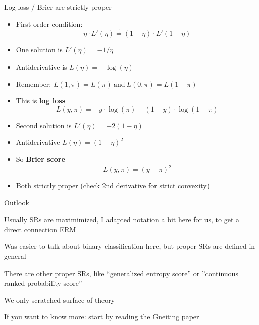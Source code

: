 \documentclass[11pt,compress,t,notes=noshow, xcolor=table]{beamer}
\begin{document}
\begin{vbframe}{Log loss / Brier are strictly proper}

\begin{itemize}
    \item First-order condition: 
    $$\eta \cdot L'(\eta) \overset{!}{=} (1-\eta) \cdot L'(1-\eta)$$
    \item One solution is $L'(\eta)=-1/\eta$ %
    \item Antiderivative is $L(\eta)=-\log(\eta)$ 
    \item Remember: 
    $L(1, \pi) = L(\pi) \ \text{and} \ L(0, \pi) = L(1-\pi)$
    \item This is \textbf{log loss} 
    $$L(y, \pi)=-y \cdot \log(\pi) - (1-y) \cdot \log(1-\pi)$$

    \item Second solution is $L'(\eta)=-2(1-\eta)$%
    \item Antiderivative $L(\eta)=(1-\eta)^2$%
    \item So \textbf{Brier score} 
    $$L(y, \pi)=(y - \pi)^2$$
  

\item Both strictly proper (check 2nd derivative for strict convexity)
\end{itemize}

\end{vbframe}

\begin{vbframe}{Outlook}

\begin{itemizeL}

    \item Usually SRs are maximimized, I adapted notation a bit here
    for us, to get a direct connection ERM

    \item Was easier to talk about binary classification here, 
    but proper SRs are defined in general

    \item There are other proper SRs, like ``generalized entropy score'' or ''continuous ranked probability score'' 

    \item We only scratched surface of theory

    \item  If you want to know more: start by reading the Gneiting paper
    
\end{itemizeL}


\end{vbframe}



\endlecture
\end{document}

